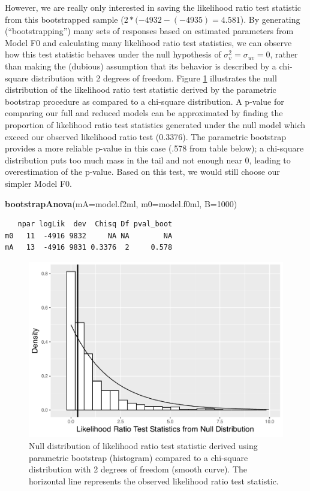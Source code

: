 \documentclass[
]{krantz}
\newenvironment{Shaded}{\begin{snugshade}}{\end{snugshade}}
\newcommand{\DataTypeTok}[1]{\textcolor[rgb]{0.27,0.27,0.27}{#1}}
\newcommand{\DecValTok}[1]{\textcolor[rgb]{0.06,0.06,0.06}{#1}}
\newcommand{\KeywordTok}[1]{\textcolor[rgb]{0.27,0.27,0.27}{\textbf{#1}}}
\newcommand{\NormalTok}[1]{#1}
\begin{document}
However, we are really only interested in saving the likelihood ratio test statistic from this bootstrapped sample (\(2*(-4932 - (-4935) = 4.581\)). By generating (``bootstrapping'') many sets of responses based on estimated parameters from Model F0 and calculating many likelihood ratio test statistics, we can observe how this test statistic behaves under the null hypothesis of \(\sigma_{v}^{2} = \sigma_{uv} = 0\), rather than making the (dubious) assumption that its behavior is described by a chi-square distribution with 2 degrees of freedom. Figure \ref{fig:paraboot9} illustrates the null distribution of the likelihood ratio test statistic derived by the parametric bootstrap procedure as compared to a chi-square distribution. A p-value for comparing our full and reduced models can be approximated by finding the proportion of likelihood ratio test statistics generated under the null model which exceed our observed likelihood ratio test (0.3376). The parametric bootstrap provides a more reliable p-value in this case (.578 from table below); a chi-square distribution puts too much mass in the tail and not enough near 0, leading to overestimation of the p-value. Based on this test, we would still choose our simpler Model F0.

\begin{Shaded}
\begin{Highlighting}[]
\KeywordTok{bootstrapAnova}\NormalTok{(}\DataTypeTok{mA=}\NormalTok{model.f2ml, }\DataTypeTok{m0=}\NormalTok{model.f0ml, }\DataTypeTok{B=}\DecValTok{1000}\NormalTok{)}
\end{Highlighting}
\end{Shaded}

\begin{verbatim}
   npar logLik  dev  Chisq Df pval_boot
m0   11  -4916 9832     NA NA        NA
mA   13  -4916 9831 0.3376  2     0.578
\end{verbatim}

\begin{figure}

{\centering \includegraphics[width=0.6\linewidth]{bookdown-BeyondMLR_files/figure-latex/paraboot9-1} 

}

\caption{Null distribution of likelihood ratio test statistic derived using parametric bootstrap (histogram) compared to a chi-square distribution with 2 degrees of freedom (smooth curve).  The horizontal line represents the observed likelihood ratio test statistic.}\label{fig:paraboot9}
\end{figure}
\end{document}
